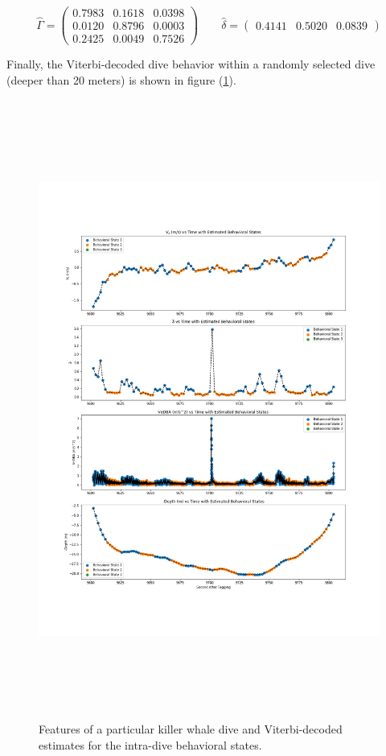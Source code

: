 $$\hat \Gamma = \begin{pmatrix} 
0.7983 & 0.1618 & 0.0398 \\
0.0120 & 0.8796 & 0.0003 \\
0.2425 & 0.0049 & 0.7526
\end{pmatrix} \qquad \hat \delta = \begin{pmatrix} 0.4141 & 0.5020 & 0.0839 \end{pmatrix}$$

Finally, the Viterbi-decoded dive behavior within a randomly selected dive (deeper than 20 meters) is shown in figure (\ref{fig:viterbi}).

\newpage

\begin{figure}[h!]
	\centering
	\includegraphics[height=8in]{../Plots/viterbi.png}
	\caption{Features of a particular killer whale dive and Viterbi-decoded estimates for the intra-dive behavioral states.}
	\label{fig:viterbi}
\end{figure}

